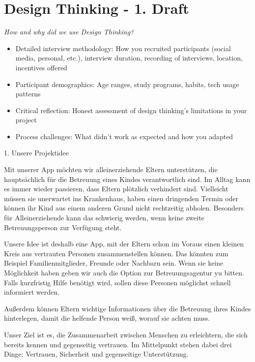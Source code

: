 \section{Design Thinking - 1. Draft}
\emph{How and why did we use Design Thinking?}

\begin{itemize}
    \item Detailed interview methodology: How you recruited participants (social media, personal, etc.), interview duration, recording of interviews, location, incentives offered
    \item Participant demographics: Age ranges, study programs, habits, tech usage patterns
    \item Critical reflection: Honest assessment of design thinking's limitations in your project
    \item Process challenges: What didn't work as expected and how you adapted
\end{itemize}

1. Unsere Projektidee

Mit unserer App möchten wir alleinerziehende Eltern unterstützen, die hauptsächlich für die Betreuung eines Kindes verantwortlich sind. Im Alltag kann es immer wieder passieren, dass Eltern plötzlich verhindert sind. Vielleicht müssen sie unerwartet ins Krankenhaus, haben einen dringenden Termin oder können ihr Kind aus einem anderen Grund nicht rechtzeitig abholen. Besonders für Alleinerziehende kann das schwierig werden, wenn keine zweite Betreuungsperson zur Verfügung steht.

Unsere Idee ist deshalb eine App, mit der Eltern schon im Voraus einen kleinen Kreis aus vertrauten Personen zusammenstellen können. Das könnten zum Beispiel Familienmitglieder, Freunde oder Nachbarn sein. Wenn sie keine Möglichkeit haben geben wir auch die Option  zur Betreuungsagentur yu bitten. Falls kurzfristig Hilfe benötigt wird, sollen diese Personen möglichst schnell informiert werden.

Außerdem können Eltern wichtige Informationen über die Betreuung ihres Kindes hinterlegen, damit die helfende Person weiß, worauf sie achten muss.

Unser Ziel ist es, die Zusammenarbeit zwischen Menschen zu erleichtern, die sich bereits kennen und gegenseitig vertrauen. Im Mittelpunkt stehen dabei drei Dinge: Vertrauen, Sicherheit und gegenseitige Unterstützung.

